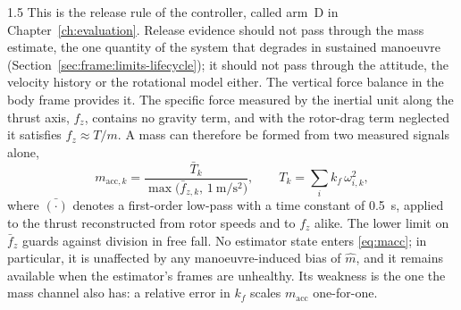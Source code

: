 \begin{spacing}{1.5}
This is the release rule of the controller, called arm~D in
Chapter~\ref{ch:evaluation}. Release evidence should not pass through the mass
estimate, the one quantity of the system that degrades in sustained manoeuvre
(Section~\ref{sec:frame:limits-lifecycle}); it should not pass through the
attitude, the velocity history or the rotational model either. The vertical force balance in the body frame provides it. The specific
force measured by the inertial unit along the thrust axis, $f_z$, contains no
gravity term, and with the rotor-drag term neglected it satisfies
$f_z\approx T/m$. A mass can therefore be formed from two measured signals
alone,
\begin{equation}
m_{\mathrm{acc},k}=\frac{\bar T_k}{\max\bigl(\bar f_{z,k},\,\SI{1}{\meter\per\second\squared}\bigr)},
\qquad
T_k=\textstyle\sum_i k_f\,\omega_{i,k}^2 ,
\label{eq:macc}
\end{equation}
where $\bar{(\cdot)}$ denotes a first-order low-pass with a time constant of
\SI{0.5}{\second}, applied to the thrust reconstructed from rotor speeds and to
$f_z$ alike. The lower limit on $\bar f_{z}$ guards against division in free
fall. No estimator state enters \eqref{eq:macc}; in particular, it is unaffected
by any manoeuvre-induced bias of $\hat m$, and it remains available when the
estimator's frames are unhealthy. Its weakness is the one the mass channel also
has: a relative error in $k_f$ scales $m_{\mathrm{acc}}$ one-for-one.


\end{spacing}
